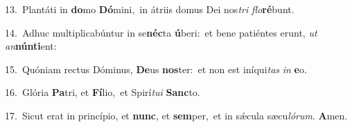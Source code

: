 {\numbfont\textcolor{\numbcolor}{13.}}~Plantáti in \textbf{do}\-mo \textbf{Dó}\-mini,~\star in átriis domus Dei nos\textit{tri} \textit{flo}\-\textbf{ré}bunt.\par
{\numbfont\textcolor{\numbcolor}{14.}}~Adhuc multiplicabúntur in se\-\textbf{néc}\-ta \textbf{ú}\-beri:~\star et bene patiéntes erunt, \textit{ut} \textit{an}\-\textbf{nún}\textbf{ti}ent:\par
{\numbfont\textcolor{\numbcolor}{15.}}~Quóniam rectus Dóminus, \textbf{De}\-us \textbf{nos}\-ter:~\star et non est iníqui\textit{tas} \textit{in} \textbf{e}\-o.\par
{\numbfont\textcolor{\numbcolor}{16.}}~Glória \textbf{Pa}\-tri, et \textbf{Fí}\-lio,~\star et Spirí\-\textit{tu}\-\textit{i} \textbf{Sanc}\-to.\par
{\numbfont\textcolor{\numbcolor}{17.}}~Sicut erat in princípio, et \textbf{nunc}\-, et \textbf{sem}\-per,~\star et in sǽcula sæcu\-\textit{ló}\-\textit{rum}. \textbf{A}\-men.\par
